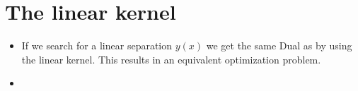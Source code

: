 
\section*{The linear kernel} %
\label{sec:the_linear_kernel}
\begin{itemize}
	\item If we search for a linear separation $y(x)$ we get the same Dual as by using the linear kernel. This results in an equivalent optimization problem.
	\item 
\end{itemize}


